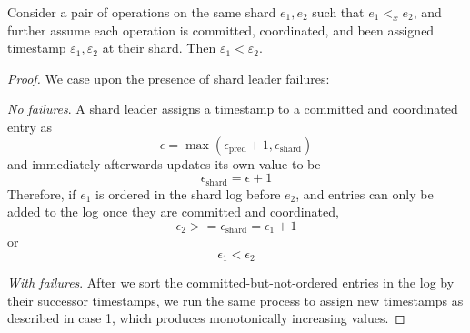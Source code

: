 \begin{lem}
\label{lemma2}
Consider a pair of operations on the same shard $e_1, e_2$ such that $e_1 <_x e_2$, and further assume each operation is committed, coordinated, and been assigned timestamp $\varepsilon_1, \varepsilon_2$ at their shard. Then $\varepsilon_1 < \varepsilon_2$.
\end{lem}
\begin{proof}
We case upon the presence of shard leader failures:

 \textit{No failures}.
A shard leader assigns a timestamp to a committed and coordinated entry as 
$$\epsilon = \max(\epsilon_{\text{pred}} + 1, \epsilon_{\text{shard}})$$ and immediately afterwards updates its own value to be 
$$\epsilon_{\text{shard}} = \epsilon + 1$$
Therefore, if $e_1$ is ordered in the shard log before $e_2$, and entries can only be added to the log once they are committed and coordinated, 
$$\epsilon_2 >= \epsilon_{\text{shard}} = \epsilon_1 + 1$$ or
$$\epsilon_1 < \epsilon_2$$

 \textit{With failures}.
After we sort the committed-but-not-ordered entries in the log by their successor timestamps, we run the same process to assign new timestamps as described in case 1, which produces monotonically increasing values.



\end{proof}

